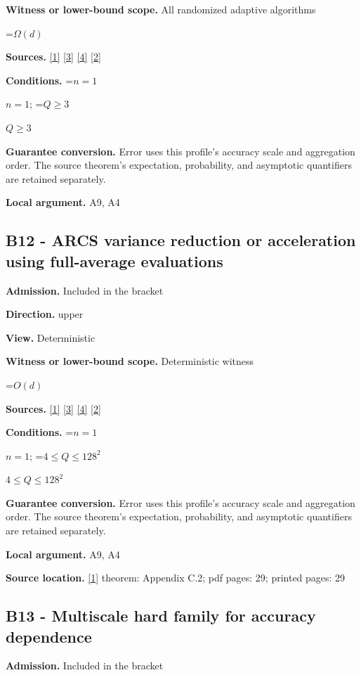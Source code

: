 \documentclass[10pt,a4paper]{article}
\newcommand{\AtlasMath}[1]{\par\begingroup\centering\setbox0=\hbox{$\displaystyle #1$}\ifdim\wd0>1.4\linewidth\typeout{ATLAS WIDE FORMULA: \the\wd0}\fi\ifdim\wd0>\linewidth\resizebox{\linewidth}{!}{\box0}\else\box0\fi\par\endgroup}
\newcommand{\AtlasInlineMath}[1]{\begingroup\setbox0=\hbox{$#1$}\ifdim\wd0>.4\linewidth\endgroup\AtlasMath{#1}\else\endgroup$#1$\fi}
\begin{document}
\textbf{Witness or lower-bound scope.} All randomized adaptive algorithms

\AtlasMath{\Omega(d)}
\textbf{Sources.} \href{https://arxiv.org/html/2610.00345v1}{[1]} \href{https://arxiv.org/html/2607.16558v2}{[3]} \href{https://www.mathnet.ru/php/archive.phtml?jrnid=mzm&option_lang=eng&paperid=1697&wshow=paper}{[4]} \href{https://arxiv.org/abs/2109.08858}{[2]}

\textbf{Conditions.} \AtlasInlineMath{n=1}; \AtlasInlineMath{Q\ge3}

\textbf{Guarantee conversion.} Error uses this profile's accuracy scale and aggregation order. The source theorem's expectation, probability, and asymptotic quantifiers are retained separately.

\textbf{Local argument.} A9, A4

\subsection{B12 - ARCS variance reduction or acceleration using full-average evaluations}
\textbf{Admission.} Included in the bracket

\textbf{Direction.} upper

\textbf{View.} Deterministic

\textbf{Witness or lower-bound scope.} Deterministic witness

\AtlasMath{O(d)}
\textbf{Sources.} \href{https://arxiv.org/html/2610.00345v1}{[1]} \href{https://arxiv.org/html/2607.16558v2}{[3]} \href{https://www.mathnet.ru/php/archive.phtml?jrnid=mzm&option_lang=eng&paperid=1697&wshow=paper}{[4]} \href{https://arxiv.org/abs/2109.08858}{[2]}

\textbf{Conditions.} \AtlasInlineMath{n=1}; \AtlasInlineMath{4\le Q\le128^2}

\textbf{Guarantee conversion.} Error uses this profile's accuracy scale and aggregation order. The source theorem's expectation, probability, and asymptotic quantifiers are retained separately.

\textbf{Local argument.} A9, A4

\textbf{Source location.} \href{https://arxiv.org/html/2610.00345v1}{[1]} theorem: Appendix C.2; pdf pages: 29; printed pages: 29

\subsection{B13 - Multiscale hard family for accuracy dependence}
\textbf{Admission.} Included in the bracket
\end{document}
